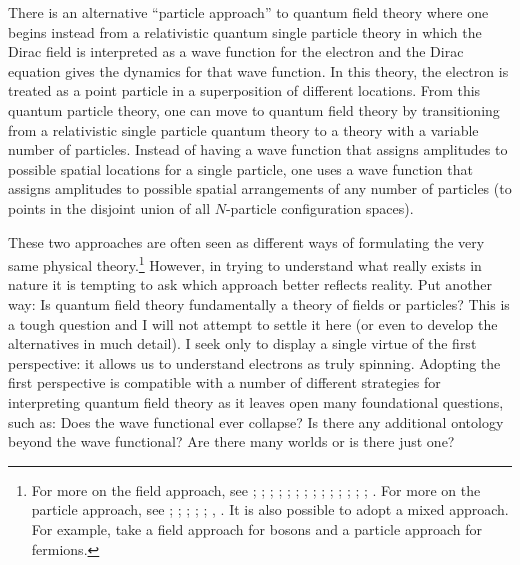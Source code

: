 \documentclass[12pt,secnumarabic,amsmath,amssymb,balancelastpage,nofootinbib]{article}
\begin{document}
There is an alternative ``particle approach'' to quantum field theory where one begins instead from a relativistic quantum single particle theory in which the Dirac field is interpreted as a wave function for the electron and the Dirac equation gives the dynamics for that wave function.  In this theory, the electron is treated as a point particle in a superposition of different locations.  From this quantum particle theory, one can move to quantum field theory by transitioning from a relativistic single particle quantum theory to a theory with a variable number of particles.  Instead of having a wave function that assigns amplitudes to possible spatial locations for a single particle, one uses a wave function that assigns amplitudes to possible spatial arrangements of any number of particles (to points in the disjoint union of all $N$-particle configuration spaces).

These two approaches are often seen as different ways of formulating the very same physical theory.\footnote{For more on the field approach, see \citet{jackiw1990}; \citet[chapters 10 and 11]{hatfield}; \citet[chapter 4]{valentini1992}; \citet[section 12.4]{holland}; \citet{valentini1996}; \citet[chapter 3]{peskinschroeder}; \citet[chapter 4]{ryder}; \citet[pg.\ 241--242]{weinberg1999}; \citet{huggett2000}; \citet{wallace2001, wallace2006, wallace2017}; \citet[chapters 2 and 4]{tong}; \citet{baker2009}; \citet{struyve2010}; \citet{duncan}; \citet[section 4.3.1]{myrvold2015}.  For more on the particle approach, see \citet[chapters 6--8]{schweberQFT}; \citet[sec.\ 13.2]{bjorkendrellfields}; \citet{thaller1992}; \citet[chapter 3]{teller}; \citet[section 3]{durr2005}; \citet{deckert}, \citet{wallace2017}.  It is also possible to adopt a mixed approach.  For example, \citet{bohmhiley} take a field approach for bosons and a particle approach for fermions.}  However, in trying to understand what really exists in nature it is tempting to ask which approach better reflects reality.  Put another way:  Is quantum field theory fundamentally a theory of fields or particles?  This is a tough question and I will not attempt to settle it here (or even to develop the alternatives in much detail).  I seek only to display a single virtue of the first perspective: it allows us to understand electrons as truly spinning.  Adopting the first perspective is compatible with a number of different strategies for interpreting quantum field theory as it leaves open many foundational questions, such as:  Does the wave functional ever collapse?  Is there any additional ontology beyond the wave functional?  Are there many worlds or is there just one?
\end{document}
